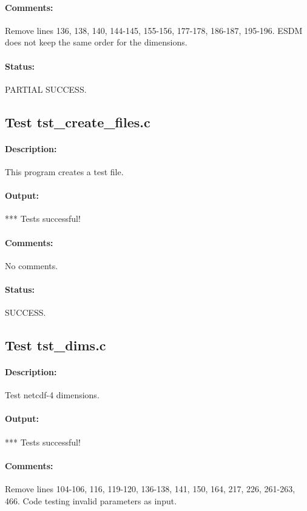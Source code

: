 \paragraph{Comments:} Remove lines 136, 138, 140, 144-145, 155-156, 177-178, 186-187, 195-196. ESDM does not keep the same order for the dimensions.

\paragraph{Status:} PARTIAL SUCCESS.

\subsection{Test tst\_create\_files.c}

\paragraph{Description:} This program creates a test file.

\paragraph{Output:} *** Tests successful!

\paragraph{Comments:} No comments.

\paragraph{Status:} SUCCESS.

\subsection{Test tst\_dims.c}

\paragraph{Description:} Test netcdf-4 dimensions.

\paragraph{Output:} *** Tests successful!

\paragraph{Comments:} Remove lines 104-106, 116, 119-120, 136-138, 141, 150, 164, 217, 226, 261-263, 466. Code testing invalid parameters as input.

